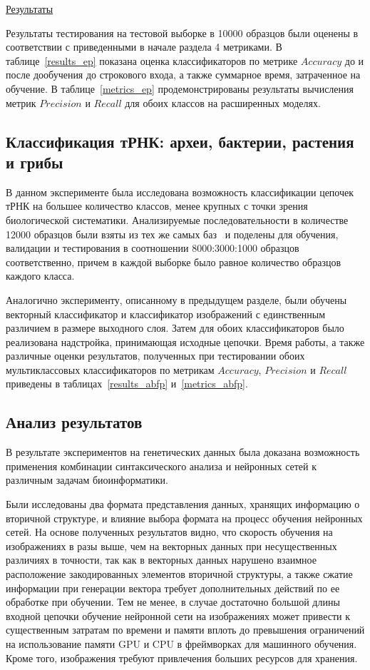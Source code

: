 \underline{Результаты}

Результаты тестирования на тестовой выборке в 10000 образцов были оценены в соответствии с приведенными в начале раздела 4 метриками. В таблице~\ref{results_ep} показана оценка классификаторов по метрике $Accuracy$ до и после дообучения до строкового входа, а также суммарное время, затраченное на обучение. В таблице~\ref{metrics_ep} продемонстрированы результаты вычисления метрик $Precision$ и $Recall$ для обоих классов на расширенных моделях.





\subsection{Классификация тРНК: археи, бактерии, растения и грибы}
В данном эксперименте была исследована возможность классификации цепочек тРНК на большее количество классов, менее крупных с точки зрения биологической систематики. Анализируемые последовательности в количестве 12000 образцов были взяты из тех же самых  баз~\cite{trnadb1,trnadb2} и поделены для обучения, валидации и тестирования в соотношении 8000:3000:1000 образцов соответственно, причем в каждой выборке было равное количество образцов каждого класса.

Аналогично эксперименту, описанному в предыдущем разделе, были обучены векторный классификатор и классификатор изображений с единственным различием в размере выходного слоя. Затем для обоих классификаторов было реализована надстройка, принимающая исходные цепочки. Время работы, а также различные оценки результатов, полученных при тестировании обоих мультиклассовых классификаторов по метрикам $Accuracy$, $Precision$ и $Recall$ приведены в таблицах~\ref{results_abfp} и~\ref{metrics_abfp}.




\subsection{Анализ результатов}
В результате экспериментов на генетических данных была доказана возможность применения комбинации синтаксического анализа и нейронных сетей к различным задачам биоинформатики.

Были исследованы два формата представления данных, хранящих информацию о вторичной структуре, и влияние выбора формата на процесс обучения нейронных сетей. На основе полученных результатов видно, что скорость обучения на изображениях в разы выше, чем на векторных данных при несущественных различиях в точности, так как в векторных данных нарушено взаимное расположение закодированных элементов вторичной структуры, а также сжатие информации при генерации вектора требует дополнительных действий по ее обработке при обучении. Тем не менее, в случае достаточно большой длины входной цепочки обучение нейронной сети на изображениях может привести к существенным затратам по времени и памяти вплоть до превышения ограничений на использование памяти GPU и CPU в фреймворках для машинного обучения. Кроме того, изображения требуют привлечения больших ресурсов для хранения.

